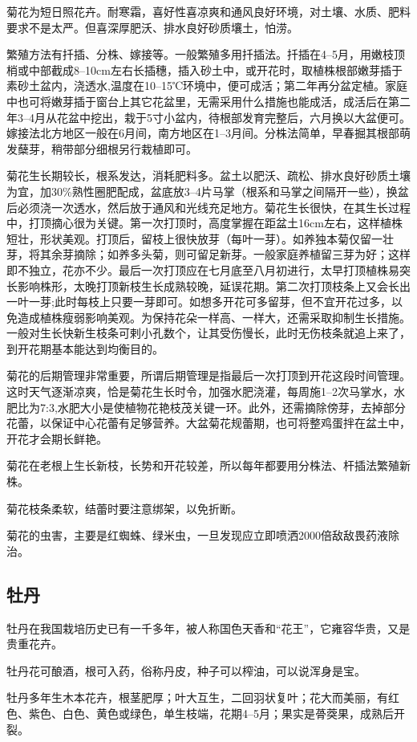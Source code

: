 \documentclass{ctexbook}
\begin{document}
菊花为短日照花卉。耐寒霜，喜好性喜凉爽和通风良好环境，对土壤、水质、肥料要求不是太严。但喜深厚肥沃、排水良好砂质壤土，怕涝。

繁殖方法有扦插、分株、嫁接等。一般繁殖多用扦插法。扦插在4--5月，用嫩枝顶梢或中部截成8--10cm左右长插穗，插入砂土中，或开花时，取植株根部嫩芽插于素砂土盆内，浇透水,温度在10--15℃环境中，便可成活；第二年再分盆定植。家庭中也可将嫩芽插于窗台上其它花盆里，无需采用什么措施也能成活，成活后在第二年3--4月从花盆中挖出，栽于5寸小盆内，待根部发育完整后，六月换以大盆便可。嫁接法北方地区一般在6月间，南方地区在1--3月间。分株法简单，早春掘其根部萌发蘖芽，稍带部分细根另行栽植即可。

菊花生长期较长，根系发达，消耗肥料多。盆土以肥沃、疏松、排水良好砂质土壤为宜，加30\%熟性圈肥配成，盆底放3--4片马掌（根系和马掌之间隔开一些），换盆后必须浇一次透水，然后放于通风和光线充足地方。菊花生长很快，在其生长过程中，打顶摘心很为关键。第一次打顶时，高度掌握在距盆土16cm左右，这样植株短壮，形状美观。打顶后，留枝上很快放芽（每叶一芽）。如养独本菊仅留一壮芽，将其余芽摘除；如养多头菊，则可留足新芽。一般家庭养植留三芽为好；这样即不独立，花亦不少。最后一次打顶应在七月底至八月初进行，太早打顶植株易突长影响株形，太晚打顶新枝生长成熟较晚，延误花期。第二次打顶枝条上又会长出一叶一芽;此时每枝上只要一芽即可。如想多开花可多留芽，但不宜开花过多，以免造成植株瘦弱影响美观。为保持花朵一样高、一样大，还需采取抑制生长措施。一般对生长快新生枝条可剌小孔数个，让其受伤慢长，此时无伤枝条就追上来了，到开花期基本能达到均衡目的。

菊花的后期管理非常重要，所谓后期管理是指最后一次打顶到开花这段时间管理。这时天气逐渐凉爽，恰是菊花生长时令，加强水肥浇灌，每周施1--2次马掌水，水肥比为7:3,水肥大小是使植物花艳枝茂关键一环。此外，还需摘除傍芽，去掉部分花蕾，以保证中心花蕾有足够营养。大盆菊花规蕾期，也可将整鸡蛋拌在盆土中，开花才会期长鲜艳。

菊花在老根上生长新枝，长势和开花较差，所以每年都要用分株法、杆插法繁殖新株。

菊花枝条柔软，结蕾时要注意绑架，以免折断。

菊花的虫害，主要是红蜘蛛、绿米虫，一旦发现应立即喷洒2000倍敌敌畏药液除治。
\subsection{牡丹}
牡丹在我国栽培历史已有一千多年，被人称国色天香和“花王”，它雍容华贵，又是贵重花卉。

牡丹花可酿酒，根可入药，俗称丹皮，种子可以榨油，可以说浑身是宝。

牡丹多年生木本花卉，根茎肥厚；叶大互生，二回羽状复叶；花大而美丽，有红色、紫色、白色、黄色或绿色，单生枝端，花期4--5月；果实是蓇葖果，成熟后开裂。
\end{document}

